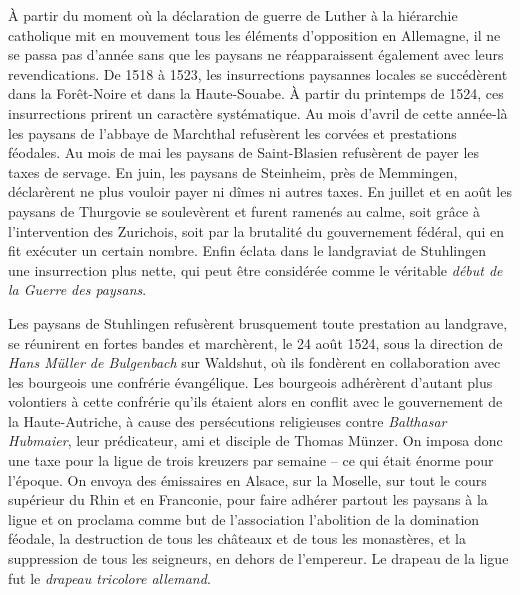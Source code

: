 \documentclass[french,twoside]{book} %
\newcommand\chaptercont{} %
\begin{document}
\chaptercont
\noindent À partir du moment où la déclaration de guerre de Luther à la hiérarchie catholique mit en mouvement tous les éléments d’opposition en Allemagne, il ne se passa pas d’année sans que les paysans ne réapparaissent également avec leurs revendications. De 1518 à 1523, les insurrections paysannes locales se succédèrent dans la Forêt-Noire et dans la Haute-Souabe. À partir du printemps de 1524, ces insurrections prirent un caractère systématique. Au mois d’avril de cette année-là les paysans de l’abbaye de Marchthal refusèrent les corvées et prestations féodales. Au mois de mai les paysans de Saint-Blasien refusèrent de payer les taxes de servage. En juin, les paysans de Steinheim, près de Memmingen, déclarèrent ne plus vouloir payer ni dîmes ni autres taxes. En juillet et en août les paysans de Thurgovie se soulevèrent et furent ramenés au calme, soit grâce à l’intervention des Zurichois, soit par la brutalité du gouvernement fédéral, qui en fit exécuter un certain nombre. Enfin éclata dans le landgraviat de Stuhlingen une insurrection plus nette, qui peut être considérée comme le véritable \emph{début de la Guerre des paysans}.\par
Les paysans de Stuhlingen refusèrent brusquement toute prestation au landgrave, se réunirent en fortes bandes et marchèrent, le 24 août 1524, sous la direction de \emph{Hans Müller de Bulgenbach} sur Waldshut, où ils fondèrent en collaboration avec les bourgeois une confrérie évangélique. Les bourgeois adhérèrent d’autant plus volontiers à cette confrérie qu’ils étaient alors en conflit avec le gouvernement de la Haute-Autriche, à cause des persécutions religieuses contre \emph{Balthasar Hubmaier}, leur prédicateur, ami et disciple de Thomas Münzer. On imposa donc une taxe pour la ligue de trois kreuzers par semaine – ce qui était énorme pour l’époque. On envoya des émissaires en Alsace, sur la Moselle, sur tout le cours supérieur du Rhin et en Franconie, pour faire adhérer partout les paysans à la ligue et on proclama comme but de l’association l’abolition de la domination féodale, la destruction de tous les châteaux et de tous les monastères, et la suppression de tous les seigneurs, en dehors de l’empereur. Le drapeau de la ligue fut le \emph{drapeau tricolore allemand}.\par
\end{document}
